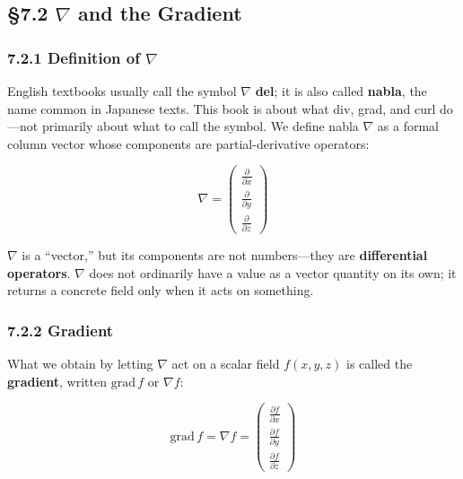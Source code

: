 \documentclass[a4paper,12pt,openany]{book}
\begin{document}
\par\vspace{0.35em}\par

\hypertarget{nabla-and-the-gradient}{%
\subsection{\texorpdfstring{§7.2 \(\nabla\) and the
Gradient}{§7.2 \textbackslash nabla and the Gradient}}\label{nabla-and-the-gradient}}

\hypertarget{definition-of-nabla}{%
\subsubsection{\texorpdfstring{7.2.1 Definition of
\(\nabla\)}{7.2.1 Definition of \textbackslash nabla}}\label{definition-of-nabla}}

English textbooks usually call the symbol \(\nabla\) \textbf{del}; it is
also called \textbf{nabla}, the name common in Japanese texts. This book
is about what div, grad, and curl do—not primarily about what to call
the symbol. We define nabla \(\nabla\) as a formal column vector whose
components are partial-derivative operators:

\[\nabla = \begin{pmatrix}
\frac{\partial}{\partial x} \\[0.5em]
\frac{\partial}{\partial y} \\[0.5em]
\frac{\partial}{\partial z}
\end{pmatrix}\]

\(\nabla\) is a ``vector,'' but its components are not numbers—they
are \textbf{differential operators}. \(\nabla\) does not ordinarily have
a value as a vector quantity on its own; it returns a concrete field
only when it acts on something.

\hypertarget{gradient}{%
\subsubsection{7.2.2 Gradient}\label{gradient}}

What we obtain by letting \(\nabla\) act on a scalar field \(f(x,y,z)\)
is called the \textbf{gradient}, written \(\mathrm{grad}\,f\) or
\(\nabla f\):

\[\mathrm{grad}\,f = \nabla f = \begin{pmatrix}
\frac{\partial f}{\partial x} \\[0.5em]
\frac{\partial f}{\partial y} \\[0.5em]
\frac{\partial f}{\partial z}
\end{pmatrix}\]
\end{document}

